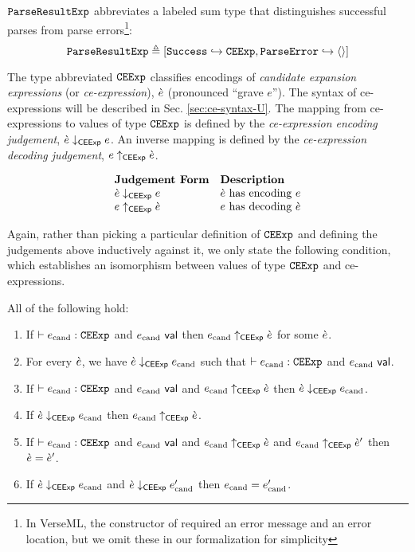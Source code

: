 \begin{enumerate}
$\mathtt{ParseResultExp}$ abbreviates a labeled sum type that distinguishes successful parses from parse errors\footnote{In VerseML, the  constructor of  required an error message and an error location, but we omit these in our formalization for simplicity}:
\[\mathtt{ParseResultExp} \triangleq [\mathtt{Success} \hookrightarrow \mathtt{CEExp}, \mathtt{ParseError} \hookrightarrow \langle  \rangle]\] 

The type abbreviated $\mathtt{CEExp}$ classifies encodings of \emph{candidate expansion expressions} (or \emph{ce-expression}), $\grave{e}$ (pronounced ``grave $e$''). The syntax of ce-expressions will be described in Sec. \ref{sec:ce-syntax-U}. The mapping from ce-expressions to values of type $\mathtt{CEExp}$ is defined by the \emph{ce-expression encoding judgement}, $\grave{e} \downarrow_\mathsf{CEExp} e$. An inverse mapping is defined by the \emph{ce-expression decoding judgement}, $e \uparrow_\mathsf{CEExp} \grave{e}$.

\[\begin{array}{ll}
\textbf{Judgement Form} & \textbf{Description}\\
\grave{e} \downarrow_\mathsf{CEExp} e & \text{$\grave{e}$ has encoding $e$}\\
e \uparrow_\mathsf{CEExp} \grave{e} & \text{$e$ has decoding $\grave{e}$}
\end{array}\]

Again, rather than picking a particular definition of $\mathtt{CEExp}$ and defining the judgements above inductively against it, we only state the following condition, which establishes an isomorphism between values of type $\mathtt{CEExp}$ and ce-expressions.

\begin{condition} All of the following hold:
\begin{enumerate}
\item If $\vdash e_\text{cand} : \mathtt{CEExp}$ and $e_\text{cand}~\mathsf{val}$ then $e_\text{cand} \uparrow_\mathsf{CEExp} \grave{e}$ for some $\grave{e}$.
\item For every $\grave{e}$, we have $\grave{e} \downarrow_\mathsf{CEExp} e_\text{cand}$ such that $\vdash e_\text{cand} : \mathtt{CEExp}$ and $e_\text{cand}~\mathsf{val}$.
\item If $\vdash e_\text{cand} : \mathtt{CEExp}$ and $e_\text{cand}~\mathsf{val}$ and $e_\text{cand} \uparrow_\mathsf{CEExp} \grave{e}$ then $\grave{e} \downarrow_\mathsf{CEExp} e_\text{cand}$.
\item If $\grave{e} \downarrow_\mathsf{CEExp} e_\text{cand}$ then $e_\text{cand} \uparrow_\mathsf{CEExp} \grave{e}$.
\item If $\vdash e_\text{cand} : \mathtt{CEExp}$ and $e_\text{cand}~\mathsf{val}$ and $e_\text{cand} \uparrow_\mathsf{CEExp} \grave{e}$ and $e_\text{cand} \uparrow_\mathsf{CEExp} \grave{e}'$ then $\grave{e}=\grave{e}'$.
\item If $\grave{e} \downarrow_\mathsf{CEExp} e_\text{cand}$ and $\grave{e} \downarrow_\mathsf{CEExp} e_\text{cand}'$ then $e_\text{cand}=e_\text{cand}'$.
\end{enumerate}
\end{condition}



\end{enumerate}
